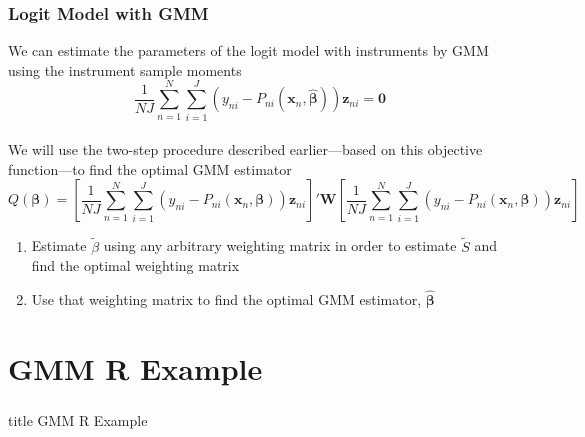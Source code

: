 \documentclass{beamer}
\begin{document}
\begin{frame}\frametitle{Logit Model with GMM}
    We can estimate the parameters of the logit model with instruments by GMM using the instrument sample moments
    $$\frac{1}{NJ} \sum_{n = 1}^N \sum_{i = 1}^J \left( y_{ni} - P_{ni}(\bm{x}_n, \widehat{\bm{\beta}}) \right) \bm{z}_{ni} = \bm{0}$$ \\
    \vspace{2ex}
    We will use the two-step procedure described earlier---based on this objective function---to find the optimal GMM estimator \\
    \vspace{1ex}
    {\scriptsize $$Q(\bm{\beta}) = \left[ \frac{1}{NJ} \sum_{n = 1}^N \sum_{i = 1}^J \left( y_{ni} - P_{ni}(\bm{x}_n, \bm{\beta}) \right) \bm{z}_{ni} \right]' \bm{W} \left[ \frac{1}{NJ} \sum_{n = 1}^N \sum_{i = 1}^J \left( y_{ni} - P_{ni}(\bm{x}_n, \bm{\beta}) \right) \bm{z}_{ni} \right]$$}
    \begin{enumerate}
    	\item Estimate $\widetilde{\beta}$ using any arbitrary weighting matrix in order to estimate $\widetilde{S}$ and find the optimal weighting matrix
    	\item Use that weighting matrix to find the optimal GMM estimator, $\widehat{\bm{\beta}}$
    \end{enumerate}
\end{frame}

\section{GMM R Example}
\label{example}
\begin{frame}\frametitle{}
    \vfill
    \centering
    \begin{beamercolorbox}[center]{title}
        \Large GMM R Example
    \end{beamercolorbox}
    \vfill
\end{frame}
\end{document}
